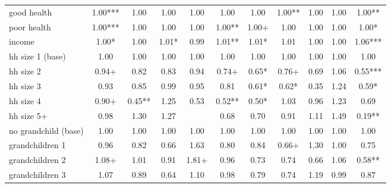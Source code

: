 {\begin{tabular}{l*{10}{c}}
good health &        1.00***&        1.00   &        1.00   &        1.00   &        1.00   &        1.00   &        1.00** &        1.00   &        1.00   &        1.00** \\
poor health &        1.00***&        1.00   &        1.00   &        1.00   &        1.00** &        1.00+  &        1.00   &        1.00   &        1.00   &        1.00*  \\
income      &        1.00*  &        1.00   &        1.01*  &        0.99   &        1.01** &        1.01*  &        1.01   &        1.00   &        1.00   &        1.06***\\
hh size 1 (base)&        1.00   &        1.00   &        1.00   &        1.00   &        1.00   &        1.00   &        1.00   &        1.00   &        1.00   &        1.00   \\
hh size 2   &        0.94+  &        0.82   &        0.83   &        0.94   &        0.74+  &        0.65*  &        0.76+  &        0.69   &        1.06   &        0.55***\\
hh size 3   &        0.93   &        0.85   &        0.99   &        0.95   &        0.81   &        0.61*  &        0.62*  &        0.35   &        1.24   &        0.59*  \\
hh size 4   &        0.90+  &        0.45** &        1.25   &        0.53   &        0.52** &        0.50*  &        1.03   &        0.96   &        1.23   &        0.69   \\
hh size 5+  &        0.98   &        1.30   &        1.27   &               &        0.68   &        0.70   &        0.91   &        1.11   &        1.49   &        0.19** \\
no grandchild (base) &        1.00   &        1.00   &        1.00   &        1.00   &        1.00   &        1.00   &        1.00   &        1.00   &        1.00   &        1.00   \\
grandchildren 1&        0.96   &        0.82   &        0.66   &        1.63   &        0.80   &        0.84   &        0.66+  &        1.30   &        1.00   &        0.75   \\
grandchildren 2&        1.08+  &        1.01   &        0.91   &        1.81+  &        0.96   &        0.73   &        0.74   &        0.66   &        1.06   &        0.58** \\
grandchildren 3&        1.07   &        0.89   &        0.64   &        1.10   &        0.98   &        0.79   &        0.74   &        1.19   &        0.99   &        0.87   \\

\end{tabular}}
